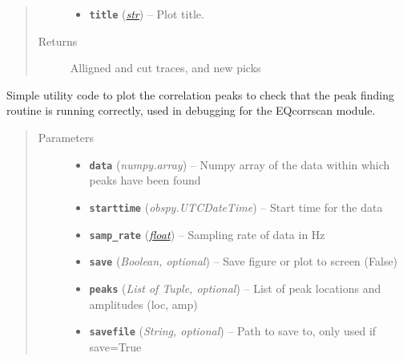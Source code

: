 \documentclass[a4paper,10pt,english]{sphinxmanual}
\begin{document}
\begin{fulllineitems}
\begin{quote}
\begin{description}
\begin{itemize}
\item {} 
\textbf{\texttt{title}} (\href{https://docs.python.org/library/functions.html\#str}{\emph{str}}) -- Plot title.

\end{itemize}

\item[{Returns}] \leavevmode
Alligned and cut traces, and new picks

\end{description}\end{quote}

\end{fulllineitems}


\begin{fulllineitems}
\label{utils:EQcorrscan_plotting.peaks_plot}
Simple utility code to plot the correlation peaks to check that the peak
finding routine is running correctly, used in debugging for the EQcorrscan
module.
\begin{quote}\begin{description}
\item[{Parameters}] \leavevmode\begin{itemize}
\item {} 
\textbf{\texttt{data}} (\emph{numpy.array}) -- Numpy array of the data within which peaks have been found

\item {} 
\textbf{\texttt{starttime}} (\emph{obspy.UTCDateTime}) -- Start time for the data

\item {} 
\textbf{\texttt{samp\_rate}} (\href{https://docs.python.org/library/functions.html\#float}{\emph{float}}) -- Sampling rate of data in Hz

\item {} 
\textbf{\texttt{save}} (\emph{Boolean, optional}) -- Save figure or plot to screen (False)

\item {} 
\textbf{\texttt{peaks}} (\emph{List of Tuple, optional}) -- List of peak locations and amplitudes (loc, amp)

\item {} 
\textbf{\texttt{savefile}} (\emph{String, optional}) -- Path to save to, only used if save=True

\end{itemize}

\end{description}\end{quote}

\end{fulllineitems}
\end{document}

